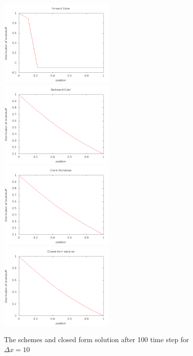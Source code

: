 \documentclass[a4wide,12pt]{article}
\begin{document}
\begin{figure}[hbtp]
	\includegraphics[width=0.5\textwidth]{Forwarddx10100}
	\includegraphics[width=0.5\textwidth]{Backwarddx10100}
	\includegraphics[width=0.5\textwidth]{Crankdx10100}
	\includegraphics[width=0.5\textwidth]{Closedform10100}
	\caption{The schemes and closed form solution after 100 time step for $\Delta x = 10$}
	\label{fig:02}
\end{figure}
\end{document}
